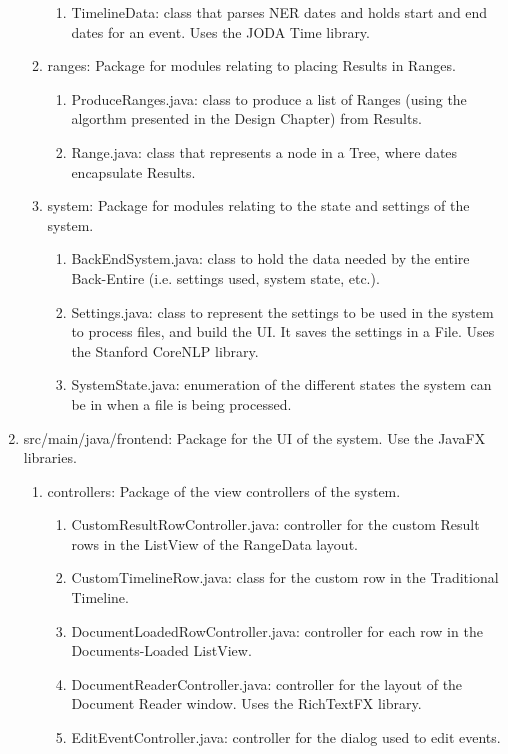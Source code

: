 \begin{enumerate}
\begin{enumerate}
\begin{enumerate}
				\item TimelineData: class that parses NER dates and holds start and end dates for an event. Uses the JODA Time library.
			\end{enumerate}
			\item ranges: Package for modules relating to placing Results in Ranges.
			\begin{enumerate}
				\item ProduceRanges.java: class to produce a list of Ranges (using the algorthm presented in the Design Chapter) from Results.
				\item Range.java: class that represents a node in a Tree, where dates encapsulate Results.
			\end{enumerate}
			\item system: Package for modules relating to the state and settings of the system.
			\begin{enumerate}
				\item BackEndSystem.java: class to hold the data needed by the entire Back-Entire (i.e. settings used, system state, etc.).
				\item Settings.java: class to represent the settings to be used in the system to process files, and build the UI. It saves the settings in a File. Uses the Stanford CoreNLP library.
				\item SystemState.java: enumeration of the different states the system can be in when a file is being processed.
			\end{enumerate}
		\end{enumerate}
	\item src/main/java/frontend: Package for the UI of the system. Use the JavaFX libraries.
	\begin{enumerate}
		\item controllers: Package of the view controllers of the system. 
		\begin{enumerate}
			\item CustomResultRowController.java: controller for the custom Result rows in the ListView of the RangeData layout.
			\item CustomTimelineRow.java: class for the custom row in the Traditional Timeline.
			\item DocumentLoadedRowController.java: controller for each row in the Documents-Loaded ListView.
			\item DocumentReaderController.java: controller for the layout of the Document Reader window. Uses the RichTextFX library.
			\item EditEventController.java: controller for the dialog used to edit events.

\end{enumerate}
\end{enumerate}
\end{enumerate}
